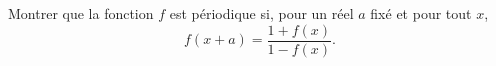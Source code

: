 Montrer que la fonction $f$ est périodique si, pour un réel $a$ fixé et pour tout $x$,
\[ f(x + a) = \frac{1 + f(x)}{1 - f(x)}. \]
